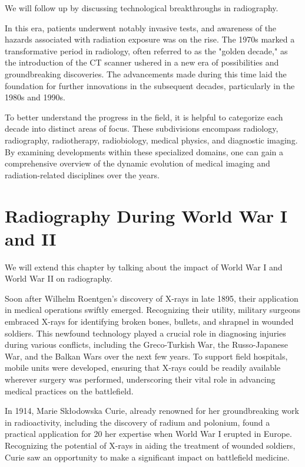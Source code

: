 \documentclass[a4paper,12pt]{report}
\begin{document}
We will follow up by discussing technological breakthroughs in radiography. 

In this era, patients underwent notably invasive tests, and awareness of the hazards
associated with radiation exposure was on the rise. The 1970s marked a transformative
period in radiology, often referred to as the "golden decade," as the introduction of the CT
scanner ushered in a new era of possibilities and groundbreaking discoveries. The
advancements made during this time laid the foundation for further innovations in the
subsequent decades, particularly in the 1980s and 1990s.

To better understand the progress in the field, it is helpful to categorize each decade into
distinct areas of focus. These subdivisions encompass radiology, radiography,
radiotherapy, radiobiology, medical physics, and diagnostic imaging. By examining
developments within these specialized domains, one can gain a comprehensive overview
of the dynamic evolution of medical imaging and radiation-related disciplines over the
years.

\section{Radiography During World War I and II}
We will extend this chapter by talking about the impact of World War I and World War II on radiography. 

Soon after Wilhelm Roentgen's discovery of X-rays in late 1895, their application in medical
operations swiftly emerged. Recognizing their utility, military surgeons embraced X-rays for
identifying broken bones, bullets, and shrapnel in wounded soldiers. This newfound technology
played a crucial role in diagnosing injuries during various conflicts, including the Greco-Turkish
War, the Russo-Japanese War, and the Balkan Wars over the next few years. To support field
hospitals, mobile units were developed, ensuring that X-rays could be readily available wherever
surgery was performed, underscoring their vital role in advancing medical practices on the
battlefield.

In 1914, Marie Skłodowska Curie, already renowned for her groundbreaking work in
radioactivity, including the discovery of radium and polonium, found a practical application for
20
her expertise when World War I erupted in Europe. Recognizing the potential of X-rays in aiding
the treatment of wounded soldiers, Curie saw an opportunity to make a significant impact on
battlefield medicine.
\end{document}
